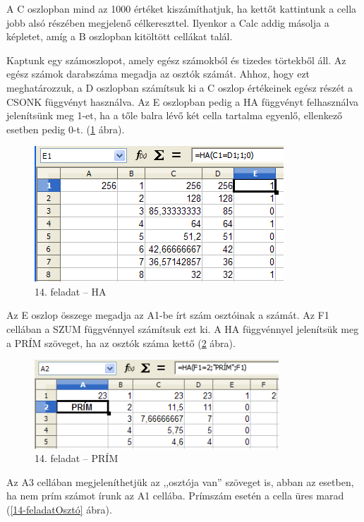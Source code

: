 A C oszlopban mind az 1000 értéket kiszámíthatjuk, ha kettőt
kattintunk a cella jobb alsó részében megjelenő
célkereszttel. Ilyenkor a Calc addig másolja a képletet, amíg a B
oszlopban kitöltött cellákat talál.

Kaptunk egy számoszlopot, amely egész számokból és tizedes
törtekből áll. Az egész számok darabszáma megadja az
osztók számát. Ahhoz, hogy ezt meghatározzuk, a D oszlopban
számítsuk ki a C oszlop értékeinek egész részét a CSONK
függvényt használva. Az E oszlopban pedig a HA függvényt
felhasználva jelenítsünk meg 1-et, ha a tőle balra lévő
két cella tartalma egyenlő, ellenkező esetben pedig 0-t.
(\ref{14-feladatIF} ábra).

\begin{figure}[!h]
\begin{center}
\includegraphics[width=9.338cm]{oocalcv2-img78.png}
\caption{14. feladat -- HA}\label{14-feladatIF}
\end{center}
\end{figure}

Az E oszlop összege megadja az A1-be írt szám osztóinak a
számát. Az F1 cellában a SZUM függvénnyel számítsuk ezt
ki. A HA függvénnyel jelenítsük meg a PRÍM szöveget, ha az
osztók száma kettő (\ref{14-feladatPrím} ábra).

\begin{figure}[!h]
\begin{center}
\includegraphics[width=9.158cm]{oocalcv2-img79.png}
\caption{14. feladat -- PRÍM}\label{14-feladatPrím}
\end{center}
\end{figure}

Az A3 cellában megjeleníthetjük az ,,osztója
van'' szöveget is, abban az esetben, ha nem prím
számot írunk az A1 cellába. Prímszám esetén a cella üres
marad (\ref{14-feladatOsztó} ábra).

